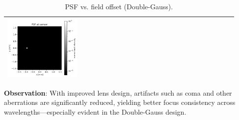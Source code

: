 \documentclass[11pt,a4paper]{article}
\begin{document}
\begin{table}[H]
\begin{tabular}{>{\centering\arraybackslash}m{0.31\linewidth} >{\centering\arraybackslash}m{0.31\linewidth} >{\centering\arraybackslash}m{0.31\linewidth}}
			\includegraphics[width=\linewidth,keepaspectratio]{offaxis/biconvex_psf_35.00_log.png} \\
			\bottomrule
		\end{tabular}
		\caption{PSF vs. field offset (Double-Gauss).}
	\end{table}
	
	\textbf{Observation}: With improved lens design, artifacts such as coma and other aberrations are significantly reduced, yielding better focus consistency across wavelengths---especially evident in the Double-Gauss design.
	
\end{document}
